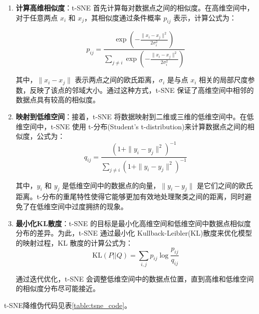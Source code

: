 \documentclass[master]{thesis-uestc}
\begin{document}
\begin{enumerate}[label={(\arabic*)}]
    \item \textbf{计算高维相似度}：t-SNE 首先计算每对数据点之间的相似度。在高维空间中，对于任意两点 \(x_i\) 和 \(x_j\)，其相似度通过条件概率 \(p_{ij}\) 表示，计算公式为：
    
    \begin{equation}
    p_{ij} = \frac{\exp\left( -\frac{\|x_i - x_j\|^2}{2\sigma_i^2} \right)}{\sum_{j \neq i} \exp\left( -\frac{\|x_i - x_j\|^2}{2\sigma_i^2} \right)}
    \end{equation}
    
    其中，\(\|x_i - x_j\|\) 表示两点之间的欧氏距离，\(\sigma_i\) 是与点 \(x_i\) 相关的局部尺度参数，反映了该点的邻域大小。通过这种方式，t-SNE 保证了高维空间中相邻的数据点具有较高的相似度。
    
    \item \textbf{映射到低维空间}：接着，t-SNE 将数据映射到二维或三维的低维空间中。在低维空间中，t-SNE 使用 t-分布(Student's t-distribution)来计算数据点之间的相似度，公式为：    
    \begin{equation}
    q_{ij} = \frac{\left( 1 + \|y_i - y_j\|^2 \right)^{-1}}{\sum_{j \neq i} \left( 1 + \|y_i - y_j\|^2 \right)^{-1}}
    \end{equation}    

    其中，\(y_i\) 和 \(y_j\) 是低维空间中的数据点的向量，\(\|y_i - y_j\|\) 是它们之间的欧氏距离。t-分布的重尾特性使得它能够更加有效地处理聚类之间的距离，同时避免了在低维空间中过度拥挤的现象。
    
    \item \textbf{最小化KL散度}：t-SNE 的目标是最小化高维空间和低维空间中数据点相似度分布的差异。为此，t-SNE 通过最小化 Kullback-Leibler(KL)散度来优化模型的映射过程，KL 散度的计算公式为：    
    \begin{equation}
    \text{KL}(P || Q) = \sum_{i,j} p_{ij} \log \frac{p_{ij}}{q_{ij}}
    \end{equation}
    
    通过迭代优化，t-SNE 会调整低维空间中的数据点位置，直到高维和低维空间的相似度分布尽可能接近。
\end{enumerate}
t-SNE降维伪代码见表\ref{table:tsne_code}。
\end{document}
